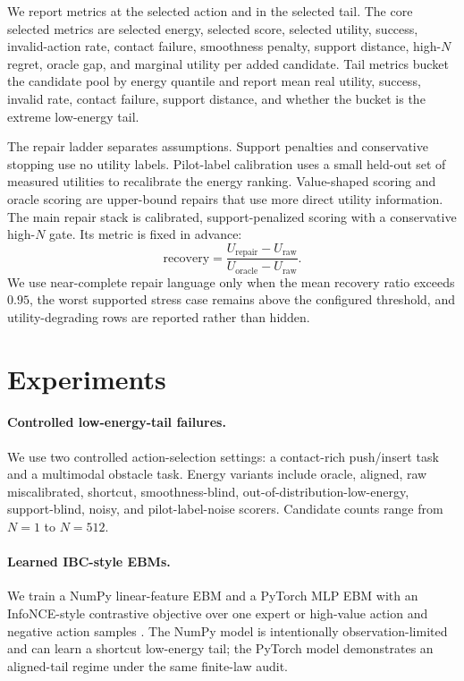 \documentclass{article}
\begin{document}
We report metrics at the selected action and in the selected tail. The core selected metrics are selected energy, selected score, selected utility, success, invalid-action rate, contact failure, smoothness penalty, support distance, high-\(N\) regret, oracle gap, and marginal utility per added candidate. Tail metrics bucket the candidate pool by energy quantile and report mean real utility, success, invalid rate, contact failure, support distance, and whether the bucket is the extreme low-energy tail.

The repair ladder separates assumptions. Support penalties and conservative stopping use no utility labels. Pilot-label calibration uses a small held-out set of measured utilities to recalibrate the energy ranking. Value-shaped scoring and oracle scoring are upper-bound repairs that use more direct utility information. The main repair stack is calibrated, support-penalized scoring with a conservative high-\(N\) gate. Its metric is fixed in advance:
\begin{equation}
    \mathrm{recovery} =
    \frac{U_{\mathrm{repair}} - U_{\mathrm{raw}}}
         {U_{\mathrm{oracle}} - U_{\mathrm{raw}}}.
    \label{eq:recovery}
\end{equation}
We use near-complete repair language only when the mean recovery ratio exceeds \(0.95\), the worst supported stress case remains above the configured threshold, and utility-degrading rows are reported rather than hidden.

\section{Experiments}

\paragraph{Controlled low-energy-tail failures.}
We use two controlled action-selection settings: a contact-rich push/insert task and a multimodal obstacle task. Energy variants include oracle, aligned, raw miscalibrated, shortcut, smoothness-blind, out-of-distribution-low-energy, support-blind, noisy, and pilot-label-noise scorers. Candidate counts range from \(N=1\) to \(N=512\).

\paragraph{Learned IBC-style EBMs.}
We train a NumPy linear-feature EBM and a PyTorch MLP EBM with an InfoNCE-style contrastive objective over one expert or high-value action and negative action samples \citep{gutmann2010noise,oord2018representation,florence2022implicit}. The NumPy model is intentionally observation-limited and can learn a shortcut low-energy tail; the PyTorch model demonstrates an aligned-tail regime under the same finite-law audit.
\end{document}

